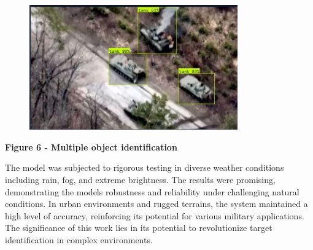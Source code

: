 \begin{figure}[H]
	\centering
	\includegraphics[width=0.8\textwidth]{assets/20}
	\caption*{}
\end{figure}

\textbf{Figure 6 - Multiple object identification}

The model was subjected to rigorous testing in diverse weather
conditions including rain, fog, and extreme brightness. The results were
promising, demonstrating the model\textquotesingle s robustness and
reliability under challenging natural conditions. In urban environments
and rugged terrains, the system maintained a high level of accuracy,
reinforcing its potential for various military applications. The
significance of this work lies in its potential to revolutionize target
identification in complex environments.

